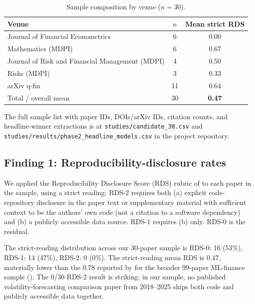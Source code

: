 \begin{table}[H]
\centering
\caption{Sample composition by venue ($n=30$).}\label{tab:phase2_venues}
\begin{tabular}{lcc}
\toprule
Venue & $n$ & Mean strict RDS \\
\midrule
Journal of Financial Econometrics & 6 & 0.00 \\
Mathematics (MDPI) & 6 & 0.67 \\
Journal of Risk and Financial Management (MDPI) & 4 & 0.50 \\
Risks (MDPI) & 3 & 0.33 \\
arXiv q-fin & 11 & 0.64 \\
\midrule
Total / overall mean & 30 & \textbf{0.47} \\
\bottomrule
\end{tabular}
\end{table}

The full sample list with paper IDs, DOIs/arXiv IDs, citation counts, and headline-winner extractions is at \texttt{studies/candidate\_30.csv} and \texttt{studies/results/phase2\_headline\_models.csv} in the project repository.

\subsection{Finding 1: Reproducibility-disclosure rates}\label{sec:phase2_rds}

We applied the Reproducibility Disclosure Score (RDS) rubric of \citet{Khan2026Survey} to each paper in the sample, using a strict reading: RDS-2 requires both (a) explicit code-repository disclosure in the paper text or supplementary material with sufficient context to be the authors' own code (not a citation to a software dependency) and (b) a publicly accessible data source. RDS-1 requires (b) only. RDS-0 is the residual.

The strict-reading distribution across our 30-paper sample is RDS-0: 16 (53\%), RDS-1: 14 (47\%), RDS-2: 0 (0\%). The strict-reading mean RDS is 0.47, materially lower than the 0.78 reported by \citet{Khan2026Survey} for the broader 99-paper ML-finance sample (). The 0/30 RDS-2 result is striking: in our sample, no published volatility-forecasting comparison paper from 2018--2025 ships both code and publicly accessible data together.

